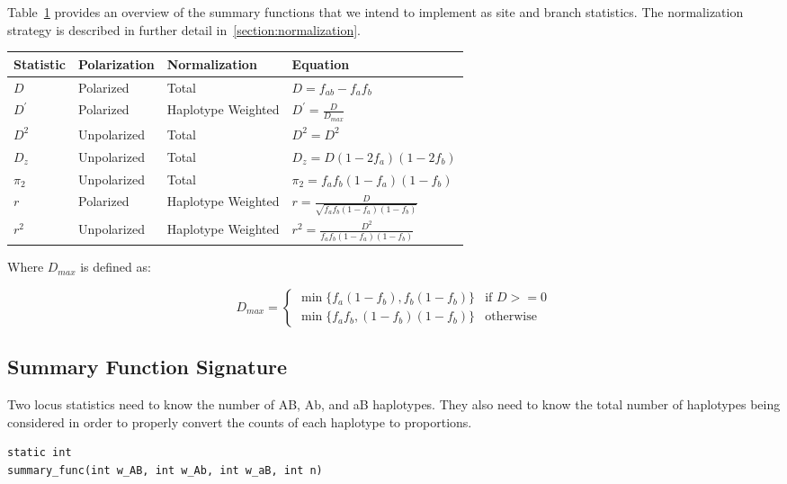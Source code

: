 \documentclass[12pt]{article}
\begin{document}
Table~\ref{table:summary_functions} provides an overview of the summary
functions that we intend to implement as site and branch statistics. The
normalization strategy is described in further detail in~\ref{section:normalization}.

\begin{table}[H]
  \begin{tabular}{llll} Statistic & Polarization & Normalization & Equation\\

    \hline $D$ & Polarized & Total & $D = f_{ab} - f_{a}f_{b}$ \\

    $D^{\prime}$ & Polarized & Haplotype Weighted & $D^{\prime} =
\frac{D}{D_{max}}$ \\

    $D^{2}$ & Unpolarized & Total & $D^{2} = D^{2}$ \\

    $D_{z}$ & Unpolarized & Total & $D_{z} = D (1 - 2 f_{a})(1-2f_{b})$ \\

    $\pi_{2}$ & Unpolarized & Total & $\pi_{2} = f_{a}f_{b}(1-f_{a})(1-f_{b})$
\\

    $r$ & Polarized & Haplotype Weighted & $r =
\frac{D}{\sqrt{f_{a}f_{b}(1-f_{a})(1-f_{b})}}$ \\

    $r^{2}$ & Unpolarized & Haplotype Weighted & $r^{2} =
\frac{D^{2}}{f_{a}f_{b}(1-f_{a})(1-f_{b})}$ \\
  \end{tabular}
\label{table:summary_functions}
\end{table}
Where $D_{max}$ is defined as:

\[
  D_{max} = 
  \begin{cases}
    \min\{f_{a}(1-f_{b}),f_{b}(1-f_{b})\} & \text{if~}D>=0 \\
    \min\{f_{a}f_{b},(1-f_{b})(1-f_{b})\} & \text{otherwise}
  \end{cases}
\]

\subsection{Summary Function Signature}
Two locus statistics need to know the number of AB, Ab, and aB haplotypes. They
also need to know the total number of haplotypes being considered in order to
properly convert the counts of each haplotype to proportions.
\begin{verbatim}
static int
summary_func(int w_AB, int w_Ab, int w_aB, int n)
\end{verbatim}
\end{document}
